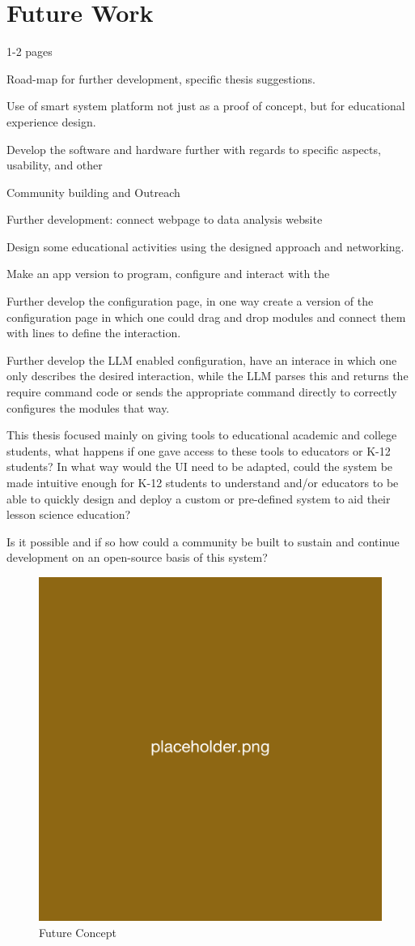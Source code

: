 \cleardoublepage%
\chapter{\label{chap:fut}Future Work}%
1-2 pages

Road-map for further development, specific thesis suggestions. 

Use of smart system platform not just as a proof of concept, but for educational experience design. 

Develop the software and hardware further with regards to specific aspects, usability, and other

Community building and Outreach

Further development: connect webpage to data analysis website

Design some educational activities using the designed approach and networking.

Make an app version to program, configure and interact with the 

Further develop the configuration page, in one way create a version of the configuration page in which one could drag and drop modules and connect them with lines to define the interaction.

Further develop the LLM enabled configuration, have an interace in which one only describes the desired interaction, while the LLM parses this and returns the require command code or sends the appropriate command directly to correctly configures the modules that way.

This thesis focused mainly on giving tools to educational academic and college students, what happens if one gave access to these tools to educators or K-12 students? In what way would the UI need to be adapted, could the system be made intuitive enough for K-12 students to understand and/or educators to be able to quickly design and deploy a custom or pre-defined system to aid their lesson science education?

Is it possible and if so how could a community be built to sustain and continue development on an open-source basis of this system?

\begin{figure}[H]
    \centering
    \includegraphics[width=0.5\linewidth]{overleaf/images/placeholder.png}
    \vspace{\ftspace}
    \caption{Future Concept}
    \label{fig:future_concept}
\end{figure}


